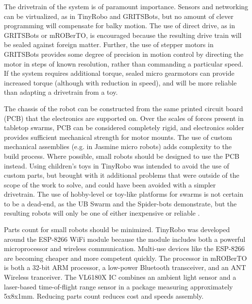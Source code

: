 The drivetrain of the system is of paramount importance. 
Sensors and networking can be virtualized, as in TinyRobo and GRITSBots, but no amount of clever programming will compensate for balky motion. 
The use of direct drive, as in GRITSBots or mROBerTO, is encouraged because the resulting drive train will be sealed against foreign matter. 
Further, the use of stepper motors in GRITSBots provides some degree of precision in motion control by directing the motor in steps of known resolution, rather than commanding a particular speed. 
If the system requires additional torque, sealed micro gearmotors can provide increased torque (although with reduction in speed), and will be more reliable than adapting a drivetrain from a toy. 

The chassis of the robot can be constructed from the same printed circuit board (PCB) that the electronics are supported on. 
Over the scales of forces present in tabletop swarms, PCB can be considered completely rigid, and electronics solder provides sufficient mechanical strength for motor mounts. 
The use of custom mechanical assemblies (e.g. in Jasmine micro robots) adds complexity to the build process. 
Where possible, small robots should be designed to use the PCB instead. 
Using children's toys in TinyRobo was intended to avoid the use of custom parts, but brought with it additional problems that were outside of the scope of the work to solve, and could have been avoided with a simpler drivetrain. 
The use of hobby-level or toy-like platforms for swarms is not certain to be a dead-end, as the UB Swarm and the Spider-bots demonstrate, but the resulting robots will only be one of either inexpensive or reliable \citep{patil2016ub, price2014spider}. 

Parts count for small robots should be minimized.
TinyRobo was developed around the ESP-8266 WiFi module because the module includes both a powerful microprocessor and wireless communication. 
Multi-use devices like the ESP-8266 are becoming cheaper and more competent quickly.
The processor in mROBerTO is both a 32-bit ARM processor, a low-power Bluetooth transceiver, and an ANT Wireless tranceiver. 
The VL6180X IC combines an ambient light sensor and a laser-based time-of-flight range sensor in a package measuring approximately 5x8x1mm. 
Reducing parts count reduces cost and speeds assembly. 


